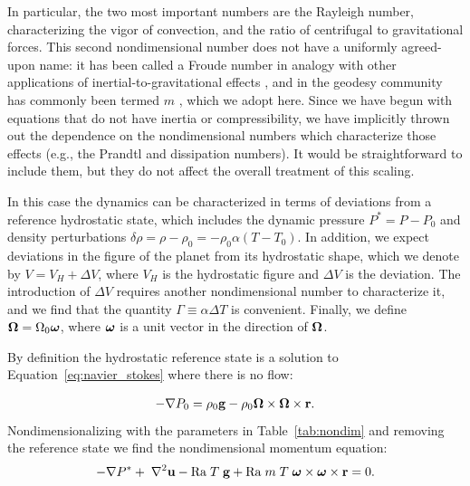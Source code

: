 \documentclass[extra,mreferee]{gji}
\begin{document}
In particular, the two most important numbers are the Rayleigh number, characterizing the vigor of convection, and the ratio of centrifugal to gravitational forces.
This second nondimensional number does not have a uniformly agreed-upon name: it has been called a Froude number in analogy with other applications of inertial-to-gravitational effects \citep{mckenzie1968influence}, 
and in the geodesy community has commonly been termed $m$ \citep[e.g.][]{nakiboglu1982hydrostatic, chambat2010flattening}, which we adopt here.
Since we have begun with equations that do not have inertia or compressibility, we have implicitly thrown out the dependence on the nondimensional numbers which characterize those effects (e.g., the Prandtl and dissipation numbers).
It would be straightforward to include them, but they do not affect the overall treatment of this scaling.

In this case the dynamics can be characterized in terms of deviations from a reference hydrostatic state, which includes the dynamic pressure $P^* = P - P_0$ and density perturbations $\delta \rho = \rho- \rho_0 = - \rho_0 \alpha (T-T_0)$.
In addition, we expect deviations in the figure of the planet from its hydrostatic shape, which we denote by $V = V_H + \Delta V$, where $V_H$ is the hydrostatic figure and $\Delta V$ is the deviation.
The introduction of $\Delta V$ requires another nondimensional number to characterize it, and we find that the quantity $\Gamma \equiv \alpha \Delta T$ is convenient.
Finally, we define $\mitbf{\Omega} = \Omega_0 \mitbf{\omega}$, where $\mitbf{\omega}$ is a unit vector in the direction of $\mitbf{\Omega}$.

By definition the hydrostatic reference state is a solution to Equation~\eqref{eq:navier_stokes} where there is no flow:

\begin{equation}
\begin{aligned}
- \nabla P_0 =  \rho_0 \mathbf{g} -  \rho_0 \mitbf{\Omega} \times \mitbf{\Omega} \times \mathbf{r}.
\label{eq:hydrostatic}
\end{aligned}
\end{equation}
Nondimensionalizing with the parameters in Table~\ref{tab:nondim} and removing the reference state we find the nondimensional momentum equation:
\begin{equation}
\begin{aligned}
 - \nabla P^* + \; \nabla^2 \mathbf{u} - \mathrm{Ra} \; T \; \mathbf{g} + \mathrm{Ra} \; m \; T \;{\mitbf{\omega} \times \mitbf{\omega} \times \mathbf{r}} = 0.
\end{aligned}
\end{equation}
\end{document}
